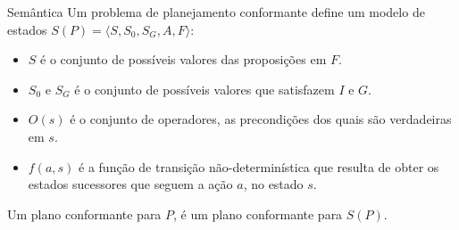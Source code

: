 \begin{frame}{Semântica}
    Um problema de planejamento conformante define um modelo de estados $S(P) = \langle S, S_0, S_G, A, F\rangle$:
    \begin{itemize}
        \item $S$ é o conjunto de possíveis valores das proposições em $F$.
        \item $S_0$ e $S_G$ é o conjunto de possíveis valores que satisfazem $I$ e $G$.
        \item $O(s)$ é o conjunto de operadores, as precondições dos quais são 
            verdadeiras em $s$.
        \item $f(a,s)$ é a função de transição não-determinística que resulta de obter 
            os estados sucessores que seguem a ação $a$, no estado $s$.
    \end{itemize}
    Um plano conformante para $P$, é um plano conformante para $S(P)$.
\end{frame}




